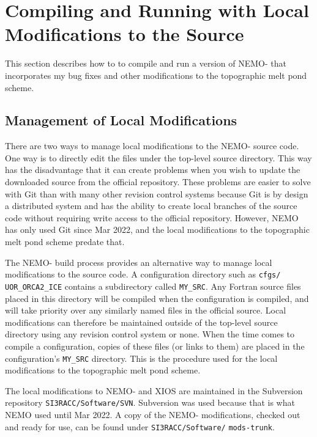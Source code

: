 \section{Compiling and Running with Local Modifications to the Source}
\label{sec:mods}

This section describes how to to compile and run a version of NEMO-\SIcu{} that incorporates my bug fixes and other modifications to the topographic melt pond scheme.

\subsection{Management of Local Modifications}
\label{sec:mods:subsec:management}

There are two ways to manage local modifications to the NEMO-\SIcu{} source code.
One way is to directly edit the files under the top-level source directory.
This way has the disadvantage that it can create problems when you wish to update the downloaded source from the official repository.
These problems are easier to solve with Git than with many other revision control systems because Git is by design a distributed system and has the ability to create local branches of the source code without requiring write access to the official repository.
However, NEMO has only used Git since Mar 2022, and the local modifications to the topographic melt pond scheme predate that.

The NEMO-\SIcu{} build process provides an alternative way to manage local modifications to the source code.
A configuration directory such as \verb|cfgs/| \verb|UOR_ORCA2_ICE| contains a subdirectory called \verb|MY_SRC|.
Any Fortran source files placed in this directory will be compiled when the configuration is compiled, and will take priority over any similarly named files in the official source.
Local modifications can therefore be maintained outside of the top-level source directory using any revision control system or none.
When the time comes to compile a configuration, copies of these files (or links to them) are placed in the configuration's \verb|MY_SRC| directory.
This is the procedure used for the local modifications to the topographic melt pond scheme.

The local modifications to NEMO-\SIcu{} and XIOS are maintained in the Subversion repository \verb|SI3RACC/Software/SVN|.
Subversion was used because that is what NEMO used until Mar 2022.
A copy of the NEMO-\SIcu{} modifications, checked out and ready for use, can be found under \verb|SI3RACC/Software/| \verb|mods-trunk|.

